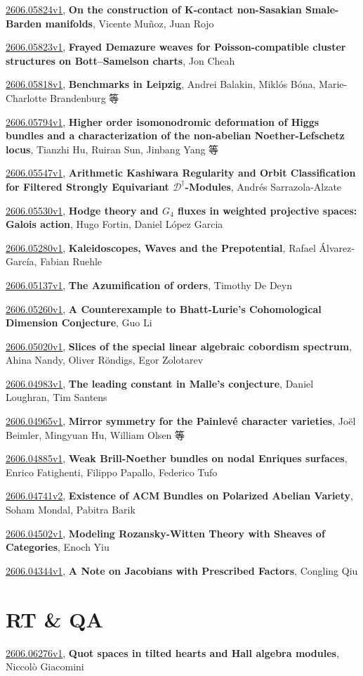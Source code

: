 \documentclass[9pt, a4paper]{article}
\theoremstyle{plain}
\theoremstyle{definition}
\theoremstyle{remark}
\newcommand{\arxiv}[3]{\href{https://arxiv.org/abs/#1}{#1}, \textbf{\textcolor{arxivblue}{#2}}, #3}
\begin{document}
\arxiv{2606.05824v1}{On the construction of K-contact non-Sasakian Smale-Barden manifolds}{Vicente Muñoz, Juan Rojo}

\arxiv{2606.05823v1}{Frayed Demazure weaves for Poisson-compatible cluster structures on Bott--Samelson charts}{Jon Cheah}

\arxiv{2606.05818v1}{Benchmarks in Leipzig}{Andrei Balakin, Miklós Bóna, Marie-Charlotte Brandenburg 等}

\arxiv{2606.05794v1}{Higher order isomonodromic deformation of Higgs bundles and a characterization of the non-abelian Noether-Lefschetz locus}{Tianzhi Hu, Ruiran Sun, Jinbang Yang 等}

\arxiv{2606.05547v1}{Arithmetic Kashiwara Regularity and Orbit Classification for Filtered Strongly Equivariant $\mathcal{D}^{\dagger}$-Modules}{Andrés Sarrazola-Alzate}

\arxiv{2606.05530v1}{Hodge theory and $G_4$ fluxes in weighted projective spaces: Galois action}{Hugo Fortin, Daniel López Garcia}

\arxiv{2606.05280v1}{Kaleidoscopes, Waves and the Prepotential}{Rafael Álvarez-García, Fabian Ruehle}

\arxiv{2606.05137v1}{The Azumification of orders}{Timothy De Deyn}

\arxiv{2606.05260v1}{A Counterexample to Bhatt-Lurie's Cohomological Dimension Conjecture}{Guo Li}

\arxiv{2606.05020v1}{Slices of the special linear algebraic cobordism spectrum}{Ahina Nandy, Oliver Röndigs, Egor Zolotarev}

\arxiv{2606.04983v1}{The leading constant in Malle's conjecture}{Daniel Loughran, Tim Santens}

\arxiv{2606.04965v1}{Mirror symmetry for the Painlevé character varieties}{Joël Beimler, Mingyuan Hu, William Olsen 等}

\arxiv{2606.04885v1}{Weak Brill-Noether bundles on nodal Enriques surfaces}{Enrico Fatighenti, Filippo Papallo, Federico Tufo}

\arxiv{2606.04741v2}{Existence of ACM Bundles on Polarized Abelian Variety}{Soham Mondal, Pabitra Barik}

\arxiv{2606.04502v1}{Modeling Rozansky-Witten Theory with Sheaves of Categories}{Enoch Yiu}

\arxiv{2606.04344v1}{A Note on Jacobians with Prescribed Factors}{Congling Qiu}


\section{RT \& QA}
\arxiv{2606.06276v1}{Quot spaces in tilted hearts and Hall algebra modules}{Niccolò Giacomini}
\end{document}
